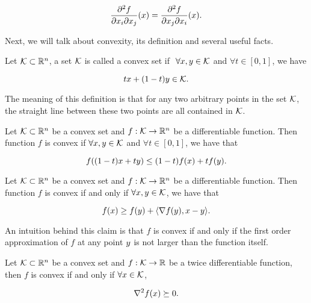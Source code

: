 \documentclass[../main.tex]{subfiles}
\begin{document}
\begin{equation*}
	\frac{\partial ^2 f}{\partial x_i \partial x_j} (x) = \frac{\partial ^2 f}{\partial x_j \partial x_i} (x).
\end{equation*}

Next, we will talk about convexity, its definition and several useful facts.

\begin{definition}
	Let $\mathcal{K} \subset \mathbb{R}^n$, a set $\mathcal{K}$ is called a convex set if  $\ \forall x,y \in \mathcal{K}$ and $\forall t \in [0,1]$, we have
	
	\begin{equation}
		tx + (1-t)y \in \mathcal{K}.
	\end{equation}
	
	The meaning of this definition is that for any two arbitrary points in the set $\mathcal{K}$, the straight line between these two points are all contained in $\mathcal{K}$.
\end{definition}

\begin{definition}
	Let $\mathcal{K} \subset \mathbb{R}^n$ be a convex set and $f: \mathcal{K} \to \mathbb{R}^n$ be a differentiable function. Then function $f$ is convex if $\forall x,y \in \mathcal{K}$ and $\forall t\in [0, 1]$, we have that
	
	\begin{equation}
	f((1-t)x + t y) \leq (1-t) f(x)+ t f(y). \label{convex_f_1}
	\end{equation}
\end{definition}


\begin{claim}
	Let $\mathcal{K} \subset \mathbb{R}^n$ be a convex set and $f: \mathcal{K} \to \mathbb{R}^n$ be a differentiable function. Then function $f$ is convex if and only if $\forall x,y \in \mathcal{K}$, we have that
	
	\begin{equation}
		f(x) \geq f(y) + \langle \nabla f(y) , x - y \rangle. \label{convex_f_2}
	\end{equation}
\end{claim}

An intuition behind this claim is that $f$ is convex if and only if the first order approximation of $f$ at any point $y$ is not larger than the function itself.
\begin{claim}
	Let $\mathcal{K} \subset \mathbb{R}^n$ be a convex set and $f: \mathcal{K} \to \mathbb{R}$ be a twice differentiable function, then $f$ is convex if and only if  $\forall x \in \mathcal{K}$, 
	
	\begin{equation}
		\nabla^2 f(x) \succeq 0. \label{convex_f_3}
	\end{equation}
\end{claim}
\end{document}
